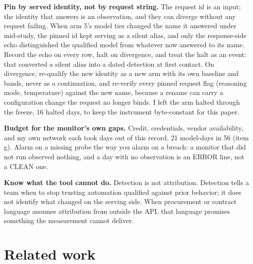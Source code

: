\documentclass[conference]{IEEEtran}
\begin{document}
\textbf{Pin by served identity, not by request string.} The request id
is an input; the identity that answers is an observation, and they can
diverge without any request failing. When arm 5's model tier changed
the name it answered under mid-study, the pinned id kept serving as a
silent alias, and only the response-side echo distinguished the
qualified model from whatever now answered to its name. Record the
echo on every row, halt on divergence, and treat the halt as an event:
that converted a silent alias into a dated detection at first contact.
On divergence, re-qualify the new identity as a new arm with its own
baseline and bands, never as a continuation, and re-verify every
pinned request flag (reasoning mode, temperature) against the new
name, because a rename can carry a configuration change the request no
longer binds. I left the arm halted through the freeze, 16 halted
days, to keep the instrument byte-constant for this paper.

\textbf{Budget for the monitor's own gaps.} Credit, credentials,
vendor availability, and my own network each took days out of this
record, 21 model-days in 56 (item g). Alarm on a missing probe the way
you alarm on a breach: a monitor that did not run observed nothing,
and a day with no observation is an ERROR line, not a CLEAN one.

\textbf{Know what the tool cannot do.} Detection is not attribution.
Detection tells a team when to stop trusting automation qualified
against prior behavior; it does not identify what changed on the
serving side. When procurement or contract language assumes
attribution from outside the API, that language promises something the
measurement cannot deliver.

\section{Related work}
\end{document}

